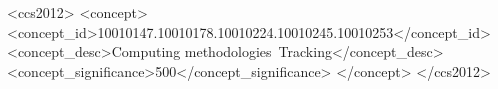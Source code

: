 %
%
\begin{CCSXML}
<ccs2012>
<concept>
<concept_id>10010147.10010178.10010224.10010245.10010253</concept_id>
<concept_desc>Computing methodologies~Tracking</concept_desc>
<concept_significance>500</concept_significance>
</concept>
</ccs2012>
\end{CCSXML}


